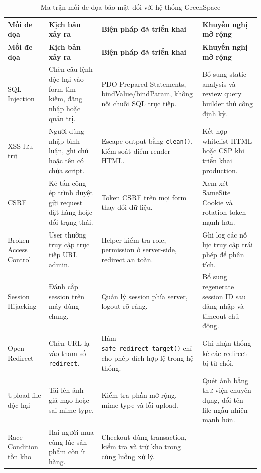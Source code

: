 \documentclass[11pt, a4paper]{article}
\begin{document}
\begingroup
\small
\setlength{\LTpre}{0pt}
\setlength{\LTpost}{0pt}
\begin{longtable}{|p{3.5cm}|p{3.8cm}|p{3.8cm}|p{3.7cm}|}
    \caption{Ma trận mối đe dọa bảo mật đối với hệ thống GreenSpace}
    \label{tab:security-threats} \\
    \hline
    \textbf{Mối đe dọa} & \textbf{Kịch bản xảy ra} & \textbf{Biện pháp đã triển khai} & \textbf{Khuyến nghị mở rộng} \\ \hline
    \endfirsthead
    \hline
    \textbf{Mối đe dọa} & \textbf{Kịch bản xảy ra} & \textbf{Biện pháp đã triển khai} & \textbf{Khuyến nghị mở rộng} \\ \hline
    \endhead
    SQL Injection &
    Chèn câu lệnh độc hại vào form tìm kiếm, đăng nhập hoặc quản trị. &
    PDO Prepared Statements, bindValue/bindParam, không nối chuỗi SQL trực tiếp. &
    Bổ sung static analysis và review query builder thủ công định kỳ. \\ \hline
    XSS lưu trữ &
    Người dùng nhập bình luận, ghi chú hoặc tên có chứa script. &
    Escape output bằng \texttt{clean()}, kiểm soát điểm render HTML. &
    Kết hợp whitelist HTML hoặc CSP khi triển khai production. \\ \hline
    CSRF &
    Kẻ tấn công ép trình duyệt gửi request đặt hàng hoặc đổi trạng thái. &
    Token CSRF trên mọi form thay đổi dữ liệu. &
    Xem xét SameSite Cookie và rotation token mạnh hơn. \\ \hline
    Broken Access Control &
    User thường truy cập trực tiếp URL admin. &
    Helper kiểm tra role, permission ở server-side, redirect an toàn. &
    Ghi log các nỗ lực truy cập trái phép để phân tích. \\ \hline
    Session Hijacking &
    Đánh cắp session trên máy dùng chung. &
    Quản lý session phía server, logout rõ ràng. &
    Bổ sung regenerate session ID sau đăng nhập và timeout chủ động. \\ \hline
    Open Redirect &
    Chèn URL lạ vào tham số \texttt{redirect}. &
    Hàm \texttt{safe\_redirect\_target()} chỉ cho phép đích hợp lệ trong hệ thống. &
    Ghi nhận thống kê các redirect bị từ chối. \\ \hline
    Upload file độc hại &
    Tải lên ảnh giả mạo hoặc sai mime type. &
    Kiểm tra phần mở rộng, mime type và lỗi upload. &
    Quét ảnh bằng thư viện chuyên dụng, đổi tên file ngẫu nhiên mạnh hơn. \\ \hline
    Race Condition tồn kho &
    Hai người mua cùng lúc sản phẩm còn ít hàng. &
    Checkout dùng transaction, kiểm tra và trừ kho trong cùng luồng xử lý. &

\end{longtable}
\end{document}
